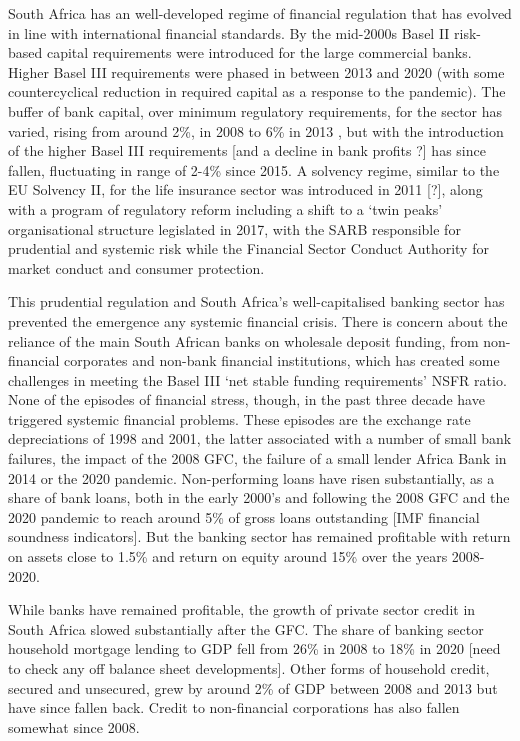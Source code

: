 \documentclass[
]{article}
\begin{document}
South Africa has an well-developed regime of financial regulation that has evolved in line with international financial standards. By the mid-2000s Basel II risk-based capital requirements were introduced for the large commercial banks. Higher Basel III requirements were phased in between 2013 and 2020 (with some countercyclical reduction in required capital as a response to the pandemic). The buffer of bank capital, over minimum regulatory requirements, for the sector has varied, rising from around 2\%, in 2008 to 6\% in 2013 , but with the introduction of the higher Basel III requirements {[}and a decline in bank profits ?{]} has since fallen, fluctuating in range of 2-4\% since 2015. A solvency regime, similar to the EU Solvency II, for the life insurance sector was introduced in 2011 {[}?{]}, along with a program of regulatory reform including a shift to a `twin peaks' organisational structure legislated in 2017, with the SARB responsible for prudential and systemic risk while the Financial Sector Conduct Authority for market conduct and consumer protection.

This prudential regulation and South Africa's well-capitalised banking sector has prevented the emergence any systemic financial crisis. There is concern about the reliance of the main South African banks on wholesale deposit funding, from non-financial corporates and non-bank financial institutions, which has created some challenges in meeting the Basel III `net stable funding requirements' NSFR ratio. None of the episodes of financial stress, though, in the past three decade have triggered systemic financial problems. These episodes are the exchange rate depreciations of 1998 and 2001, the latter associated with a number of small bank failures, the impact of the 2008 GFC, the failure of a small lender Africa Bank in 2014 or the 2020 pandemic. Non-performing loans have risen substantially, as a share of bank loans, both in the early 2000's and following the 2008 GFC and the 2020 pandemic to reach around 5\% of gross loans outstanding {[}IMF financial soundness indicators{]}. But the banking sector has remained profitable with return on assets close to 1.5\% and return on equity around 15\% over the years 2008-2020.

While banks have remained profitable, the growth of private sector credit in South Africa slowed substantially after the GFC. The share of banking sector household mortgage lending to GDP fell from 26\% in 2008 to 18\% in 2020 {[}need to check any off balance sheet developments{]}. Other forms of household credit, secured and unsecured, grew by around 2\% of GDP between 2008 and 2013 but have since fallen back. Credit to non-financial corporations has also fallen somewhat since 2008.
\end{document}
